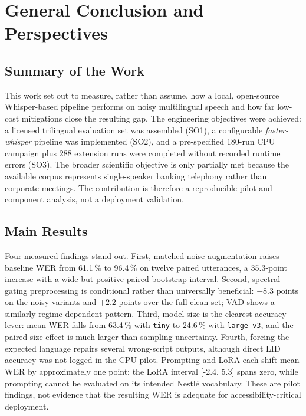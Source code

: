 \documentclass[12pt]{report}
\begin{document}
\chapter*{General Conclusion and Perspectives}
\thispagestyle{fancy}
{}
\section*{Summary of the Work}
This work set out to measure, rather than assume, how a local, open-source Whisper-based pipeline performs on noisy multilingual speech and how far low-cost mitigations close the resulting gap. The engineering objectives were achieved: a licensed trilingual evaluation set was assembled (SO1), a configurable \textit{faster-whisper} pipeline was implemented (SO2), and a pre-specified 180-run CPU campaign plus 288 extension runs were completed without recorded runtime errors (SO3). The broader scientific objective is only partially met because the available corpus represents single-speaker banking telephony rather than corporate meetings. The contribution is therefore a reproducible pilot and component analysis, not a deployment validation.
\section*{Main Results}
Four measured findings stand out. First, matched noise augmentation raises baseline WER from 61.1\,\% to 96.4\,\% on twelve paired utterances, a 35.3-point increase with a wide but positive paired-bootstrap interval. Second, spectral-gating preprocessing is conditional rather than universally beneficial: $-8.3$ points on the noisy variants and $+2.2$ points over the full clean set; VAD shows a similarly regime-dependent pattern. Third, model size is the clearest accuracy lever: mean WER falls from 63.4\,\% with \texttt{tiny} to 24.6\,\% with \texttt{large-v3}, and the paired size effect is much larger than sampling uncertainty. Fourth, forcing the expected language repairs several wrong-script outputs, although direct LID accuracy was not logged in the CPU pilot. Prompting and LoRA each shift mean WER by approximately one point; the LoRA interval [-2.4, 5.3] spans zero, while prompting cannot be evaluated on its intended Nestl\'e vocabulary. These are pilot findings, not evidence that the resulting WER is adequate for accessibility-critical deployment.
\end{document}
